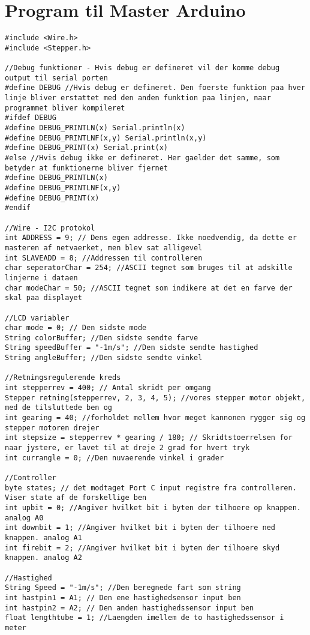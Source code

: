 \section{Program til Master Arduino}
\label{bilag:programMaster}
\begin{lstlisting}
#include <Wire.h>
#include <Stepper.h>

//Debug funktioner - Hvis debug er defineret vil der komme debug output til serial porten
#define DEBUG //Hvis debug er defineret. Den foerste funktion paa hver linje bliver erstattet med den anden funktion paa linjen, naar programmet bliver kompileret
#ifdef DEBUG
#define DEBUG_PRINTLN(x) Serial.println(x)
#define DEBUG_PRINTLNF(x,y) Serial.println(x,y)
#define DEBUG_PRINT(x) Serial.print(x)
#else //Hvis debug ikke er defineret. Her gaelder det samme, som betyder at funktionerne bliver fjernet
#define DEBUG_PRINTLN(x)
#define DEBUG_PRINTLNF(x,y)
#define DEBUG_PRINT(x)
#endif

//Wire - I2C protokol
int ADDRESS = 9; // Dens egen addresse. Ikke noedvendig, da dette er masteren af netvaerket, men blev sat alligevel
int SLAVEADD = 8; //Addressen til controlleren
char seperatorChar = 254; //ASCII tegnet som bruges til at adskille linjerne i dataen
char modeChar = 50; //ASCII tegnet som indikere at det en farve der skal paa displayet

//LCD variabler
char mode = 0; // Den sidste mode
String colorBuffer; //Den sidste sendte farve
String speedBuffer = "-1m/s"; //Den sidste sendte hastighed
String angleBuffer; //Den sidste sendte vinkel

//Retningsregulerende kreds
int stepperrev = 400; // Antal skridt per omgang
Stepper retning(stepperrev, 2, 3, 4, 5); //vores stepper motor objekt, med de tilsluttede ben og
int gearing = 40; //forholdet mellem hvor meget kannonen rygger sig og stepper motoren drejer
int stepsize = stepperrev * gearing / 180; // Skridtstoerrelsen for naar jystere, er lavet til at dreje 2 grad for hvert tryk
int currangle = 0; //Den nuvaerende vinkel i grader

//Controller
byte states; // det modtaget Port C input registre fra controlleren. Viser state af de forskellige ben
int upbit = 0; //Angiver hvilket bit i byten der tilhoere op knappen. analog A0
int downbit = 1; //Angiver hvilket bit i byten der tilhoere ned knappen. analog A1
int firebit = 2; //Angiver hvilket bit i byten der tilhoere skyd knappen. analog A2

//Hastighed
String Speed = "-1m/s"; //Den beregnede fart som string
int hastpin1 = A1; // Den ene hastighedsensor input ben
int hastpin2 = A2; // Den anden hastighedssensor input ben
float lengthtube = 1; //Laengden imellem de to hastighedssensor i meter


\end{lstlisting}
